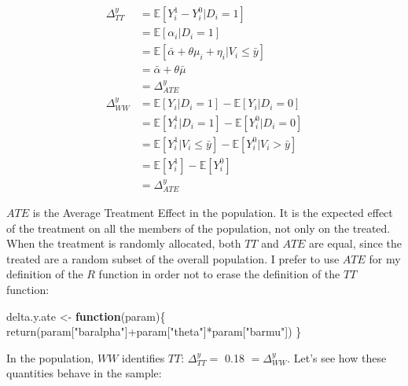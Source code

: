 \documentclass[
]{book}
\newenvironment{Shaded}{\begin{snugshade}}{\end{snugshade}}
\newcommand{\ControlFlowTok}[1]{\textcolor[rgb]{0.13,0.29,0.53}{\textbf{#1}}}
\newcommand{\FunctionTok}[1]{\textcolor[rgb]{0.00,0.00,0.00}{#1}}
\newcommand{\NormalTok}[1]{#1}
\newcommand{\OtherTok}[1]{\textcolor[rgb]{0.56,0.35,0.01}{#1}}
\newcommand{\SpecialCharTok}[1]{\textcolor[rgb]{0.00,0.00,0.00}{#1}}
\newcommand{\StringTok}[1]{\textcolor[rgb]{0.31,0.60,0.02}{#1}}
\newcommand{\esp}[1]{\mathbb{E}[ #1 ]}
\theoremstyle{definition}
\theoremstyle{definition}
\theoremstyle{definition}
\theoremstyle{definition}
\theoremstyle{remark}
\begin{document}
\begin{align*}
\Delta^y_{TT} & = \esp{Y_i^1-Y_i^0|D_i=1} \\
              & = \esp{\alpha_i|D_i=1} \\
              & = \esp{\bar{\alpha}+\theta\mu_i+\eta_i|V_i\leq\bar{y}}\\
              & = \bar{\alpha}+\theta\bar{\mu} \\
              & = \Delta^y_{ATE} \\
\Delta^y_{WW} & = \esp{Y_i|D_i=1} - \esp{Y_i|D_i=0} \\
              & = \esp{Y^1_i|D_i=1} - \esp{Y^0_i|D_i=0} \\
              & = \esp{Y^1_i|V_i\leq\bar{y}} - \esp{Y^0_i|V_i>\bar{y}} \\
              & = \esp{Y^1_i} - \esp{Y^0_i} \\
              & = \Delta^y_{ATE}
\end{align*}

\(ATE\) is the Average Treatment Effect in the population.
It is the expected effect of the treatment on all the members of the population, not only on the treated.
When the treatment is randomly allocated, both \(TT\) and \(ATE\) are equal, since the treated are a random subset of the overall population.
I prefer to use \(ATE\) for my definition of the \(R\) function in order not to erase the definition of the \(TT\) function:

\begin{Shaded}
\begin{Highlighting}[]
\NormalTok{delta.y.ate }\OtherTok{\textless{}{-}} \ControlFlowTok{function}\NormalTok{(param)\{}
  \FunctionTok{return}\NormalTok{(param[}\StringTok{"baralpha"}\NormalTok{]}\SpecialCharTok{+}\NormalTok{param[}\StringTok{"theta"}\NormalTok{]}\SpecialCharTok{*}\NormalTok{param[}\StringTok{"barmu"}\NormalTok{])}
\NormalTok{\}}
\end{Highlighting}
\end{Shaded}

In the population, \(WW\) identifies \(TT\): \(\Delta^y_{TT}=\) 0.18 \(=\Delta^y_{WW}\).
Let's see how these quantities behave in the sample:
\end{document}
